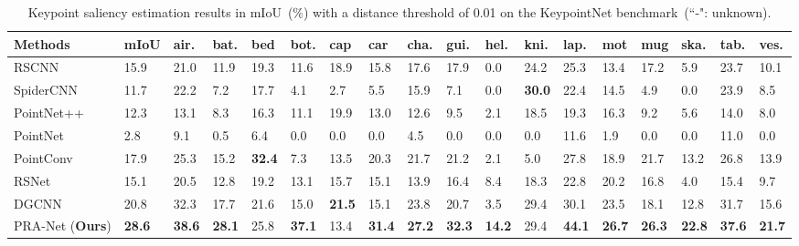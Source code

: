 \documentclass[journal]{IEEEtran}
\begin{document}
\begin{table*}[t]
\small
\centering
\caption{Keypoint saliency estimation results in mIoU~(\%) with a distance threshold of 0.01 on the KeypointNet benchmark~(``-": unknown).}
\label{table:KeypointNet_mIoU}
\begin{tabular}{|l|*{1}p{0.96cm}<{\centering}|
*{1}p{0.45cm}<{\centering}*{1}p{0.45cm}<{\centering}*{1}p{0.45cm}<{\centering}*{1}p{0.45cm}<{\centering}
*{1}p{0.45cm}<{\centering}*{1}p{0.45cm}<{\centering}*{1}p{0.45cm}<{\centering}*{1}p{0.45cm}<{\centering}
*{1}p{0.45cm}<{\centering}*{1}p{0.45cm}<{\centering}*{1}p{0.45cm}<{\centering}*{1}p{0.45cm}<{\centering}
*{1}p{0.45cm}<{\centering}*{1}p{0.45cm}<{\centering}*{1}p{0.45cm}<{\centering}*{1}p{0.45cm}<{\centering}
|}

\hline
Methods & mIoU & air. & bat. & bed & bot. & cap & car & cha. & gui. & hel. & kni. & lap. & mot & mug & ska. & tab. & ves.\\
\hline
\hline
RSCNN~\cite{liu2019relation}& 15.9 & 21.0& 11.9& 19.3& 11.6& 18.9& 15.8& 17.6& 17.9& 0.0& 24.2& 25.3& 13.4& 17.2& 5.9& 23.7& 10.1 \\
SpiderCNN~\cite{xu2018spidercnn} & 11.7 & 22.2 & 7.2 & 17.7 & 4.1 & 2.7 & 5.5 & 15.9 & 7.1 & 0.0 & \textbf{30.0} & 22.4 & 14.5 & 4.9 & 0.0 & 23.9 & 8.5 \\
PointNet++~\cite{qi2017pointnet++} & 12.3 & 13.1 & 8.3 & 16.3 & 11.1 & 19.9 & 13.0 & 12.6 & 9.5 & 2.1 & 18.5 & 19.3 & 16.3 & 9.2 & 5.6 & 14.0 & 8.0\\
PointNet~\cite{qi2017pointnet} & 2.8 & 9.1 & 0.5 & 6.4 & 0.0 & 0.0 & 0.0 & 4.5 & 0.0 & 0.0 & 0.0 & 11.6 & 1.9 & 0.0 & 0.0 & 11.0 & 0.0\\
PointConv~\cite{wu2019pointconv} & 17.9 & 25.3 & 15.2 & \textbf{32.4} & 7.3 & 13.5 & 20.3 & 21.7 & 21.2 & 2.1 & 5.0 & 27.8 & 18.9 & 21.7 & 13.2 & 26.8 & 13.9\\
RSNet~\cite{huang2018recurrent} & 15.1 & 20.5 & 12.8 & 19.2 & 13.1 & 15.7 & 15.1 & 13.9 & 16.4 & 8.4 & 18.3 & 22.8 & 20.2 & 16.8 & 4.0 & 15.4 & 9.7\\
DGCNN~\cite{wang2019dynamic} & 20.8 & 32.3 & 17.7 & 21.6 & 15.0 & \textbf{21.5} & 15.1 & 23.8 & 20.7 & 3.5 & 29.4 & 30.1 & 23.5 & 18.1 & 12.8 & 31.7 & 15.6\\
\hline
PRA-Net (\textbf{Ours}) & \textbf{28.6} & \textbf{38.6} & \textbf{28.1} & 25.8 & \textbf{37.1} & 13.4 & \textbf{31.4} & \textbf{27.2} & \textbf{32.3} & \textbf{14.2} & 29.4 & \textbf{44.1} & \textbf{26.7} & \textbf{26.3} & \textbf{22.8} & \textbf{37.6} & \textbf{21.7}  \\
\hline
\end{tabular}
\end{table*}
\end{document}
